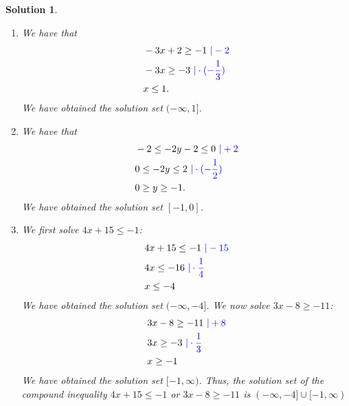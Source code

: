 \documentclass[12pt]{article}
\newtheorem{sol}[prop]{Solution}
\begin{document}
\begin{sol}
\begin{enumerate}
\begin{equation*}
\end{equation*}
We have obtained the solution set $(2,4]$.
\item[d)] We have that
\begin{equation*}
\begin{split}
& -3x+2\geq -1 \textcolor{blue}{\ |-2}\\
& -3x\geq -3\textcolor{blue}{\ |\cdot (-\frac{1}{3})}\\
&x\leq 1.
\end{split}
\end{equation*}
We have obtained the solution set $(-\infty,1]$.
\item[e)] We have that
\begin{equation*}
\begin{split}
& -2\leq -2y-2\leq 0 \textcolor{blue}{\ |+2}\\
& 0\leq -2y\leq 2\textcolor{blue}{\ |\cdot (-\frac{1}{2})}\\
&0\geq y\geq -1.
\end{split}
\end{equation*}
We have obtained the solution set $[-1,0]$.
\item[f)] We first solve $4x+15\leq -1$:
\begin{equation*}
\begin{split}
& 4x+15\leq -1 \textcolor{blue}{\ |-15}\\
& 4x\leq -16 \textcolor{blue}{\ |\cdot \frac{1}{4}}\\
&x\leq -4
\end{split}
\end{equation*}
We have obtained the solution set $(-\infty,-4]$. We now solve $3x-8\geq -11$:
\begin{equation*}
\begin{split}
& 3x-8\geq -11 \textcolor{blue}{\ |+8}\\
& 3x\geq -3\textcolor{blue}{\ |\cdot \frac{1}{3}}\\
&x\geq -1
\end{split}
\end{equation*}
We have obtained the solution set $[-1,\infty)$. Thus, the solution set of the compound inequality $4x+15\leq -1$ or $3x-8\geq -11$ is $(-\infty,-4]\cup [-1,\infty)$
\end{enumerate}
\end{sol}
\end{document}
